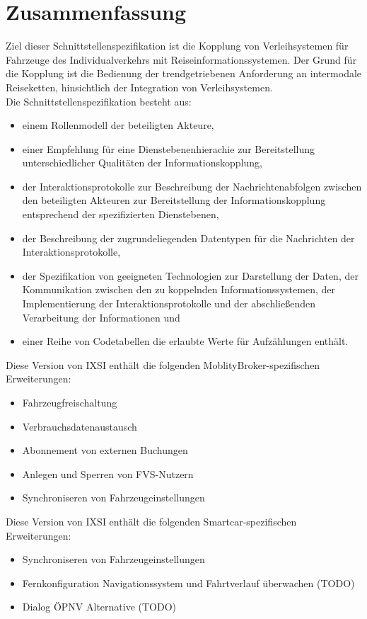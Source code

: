 \chapter{Zusammenfassung}
\label{cha:Zusammenfassung}

Ziel dieser Schnittstellenspezifikation ist die Kopplung von Verleihsystemen für Fahrzeuge des Individualverkehrs mit Reiseinformationssystemen. Der Grund für die Kopplung ist die Bedienung der trendgetriebenen Anforderung an intermodale Reiseketten,  hinsichtlich der Integration von Verleihsystemen.\\

Die Schnittstellenspezifikation besteht aus:\begin{itemize}
\item einem Rollenmodell der beteiligten Akteure,
\item einer Empfehlung für eine Dienstebenenhierachie zur Bereitstellung unterschiedlicher Qualitäten der Informationskopplung,
\item der Interaktionsprotokolle zur Beschreibung der Nachrichtenabfolgen zwischen den beteiligten Akteuren zur Bereitstellung der Informationskopplung entsprechend der spezifizierten Dienstebenen,
\item der Beschreibung der zugrundeliegenden Datentypen für die Nachrichten der Interaktionsprotokolle,
\item der Spezifikation von geeigneten Technologien zur Darstellung der Daten, der Kommunikation zwischen den zu koppelnden Informationssystemen, der Implementierung der Interaktionsprotokolle und der abschließenden Verarbeitung der Informationen und
\item einer Reihe von Codetabellen die erlaubte Werte für Aufzählungen enthält.
\end{itemize}
\bigskip
Diese Version von IXSI enthält die folgenden MoblityBroker-spezifischen Erweiterungen:
\begin{itemize}
\item Fahrzeugfreischaltung
\item Verbrauchsdatenaustausch
\item Abonnement von externen Buchungen
\item Anlegen und Sperren von FVS-Nutzern
\item Synchroniseren von Fahrzeugeinstellungen
\end{itemize}
Diese Version von IXSI enthält die folgenden Smartcar-spezifischen Erweiterungen:
\begin{itemize}
\item Synchroniseren von Fahrzeugeinstellungen
\item Fernkonfiguration Navigationssystem und Fahrtverlauf überwachen (TODO)
\item Dialog ÖPNV Alternative (TODO)
\end{itemize}
